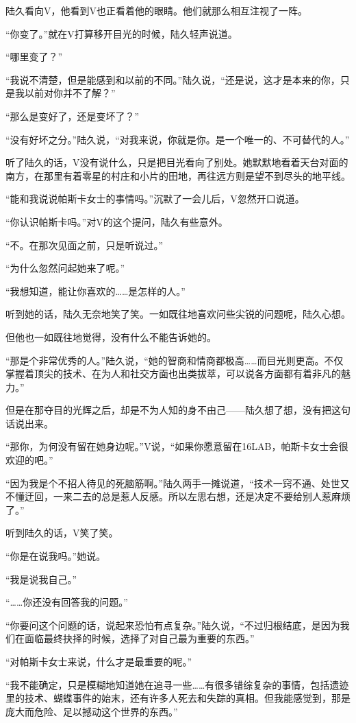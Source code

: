 陆久看向V，他看到V也正看着他的眼睛。他们就那么相互注视了一阵。

“你变了。”就在V打算移开目光的时候，陆久轻声说道。

“哪里变了？”

“我说不清楚，但是能感到和以前的不同。”陆久说，“还是说，这才是本来的你，只是我以前对你并不了解？”

“那么是变好了，还是变坏了？”

“没有好坏之分。”陆久说，“对我来说，你就是你。是一个唯一的、不可替代的人。”

听了陆久的话，V没有说什么，只是把目光看向了别处。她默默地看着天台对面的南方，在那里有着零星的村庄和小片的田地，再往远方则是望不到尽头的地平线。

“能和我说说帕斯卡女士的事情吗。”沉默了一会儿后，V忽然开口说道。

“你认识帕斯卡吗。”对V的这个提问，陆久有些意外。

“不。在那次见面之前，只是听说过。”

“为什么忽然问起她来了呢。”

“我想知道，能让你喜欢的……是怎样的人。”

听到她的话，陆久无奈地笑了笑。一如既往地喜欢问些尖锐的问题呢，陆久心想。

但他也一如既往地觉得，没有什么不能告诉她的。

“那是个非常优秀的人。”陆久说，“她的智商和情商都极高……而目光则更高。不仅掌握着顶尖的技术、在为人和社交方面也出类拔萃，可以说各方面都有着非凡的魅力。”

但是在那夺目的光辉之后，却是不为人知的身不由己——陆久想了想，没有把这句话说出来。

“那你，为何没有留在她身边呢。”V说，“如果你愿意留在16LAB，帕斯卡女士会很欢迎的吧。”

“因为我是个不招人待见的死脑筋啊。”陆久两手一摊说道，“技术一窍不通、处世又不懂迂回，一来二去的总是惹人反感。所以左思右想，还是决定不要给别人惹麻烦了。”

听到陆久的话，V笑了笑。

“你是在说我吗。”她说。

“我是说我自己。”

“……你还没有回答我的问题。”

“你要问这个问题的话，说起来恐怕有点复杂。”陆久说，“不过归根结底，是因为我们在面临最终抉择的时候，选择了对自己最为重要的东西。”

“对帕斯卡女士来说，什么才是最重要的呢。”

“我不能确定，只是模糊地知道她在追寻一些……有很多错综复杂的事情，包括遗迹里的技术、蝴蝶事件的始末，还有许多人死去和失踪的真相。但我能感觉到，那是庞大而危险、足以撼动这个世界的东西。”

